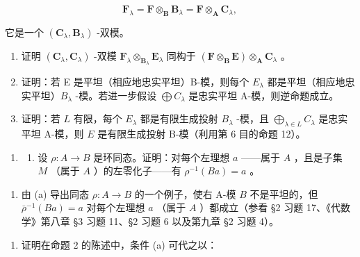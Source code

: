 \[
\mathbf {F} _ {\lambda} = \mathbf {F} \otimes_ {\mathbf {B}} \mathbf {B} _ {\lambda} = \mathbf {F} \otimes_ {\mathbf {A}} \mathbf {C} _ {\lambda},
\]

它是一个 \((\mathbf{C}_{\lambda},\mathbf{B}_{\lambda})\) -双模。

\begin{enumerate}
\def\labelenumi{(\alph{enumi})}
\item
证明 \((\mathbf{C}_{\lambda},\mathbf{C}_{\lambda})\) -双模 \(\mathbf{F}_{\lambda}\otimes_{\mathbf{B}_{\lambda}}\mathbf{E}_{\lambda}\) 同构于 \((\mathbf{F}\otimes_{\mathbf{B}}\mathbf{E})\otimes_{\mathbf{A}}\mathbf{C}_{\lambda}\) 。
\item
证明：若 E 是平坦（相应地忠实平坦）B-模，则每个 \(E_{\lambda}\) 都是平坦（相应地忠实平坦）\(B_{\lambda}\) -模。若进一步假设 \(\bigoplus C_{\lambda}\) 是忠实平坦 A-模，则逆命题成立。
\item
证明：若 \(L\) 有限，每个 \(E_{\lambda}\) 都是有限生成投射 \(B_{\lambda}\) -模，且 \(\bigoplus_{\lambda \in L} C_{\lambda}\) 是忠实平坦 A-模，则 \(E\) 是有限生成投射 B-模（利用第 6 目的命题 12）。
\end{enumerate}

\begin{enumerate}
\def\labelenumi{\arabic{enumi}.}
\setcounter{enumi}{9}
\tightlist
\item
  \begin{enumerate}
  \def\labelenumii{(\alph{enumii})}
  \tightlist
  \item
  设 \(\rho: A \to B\) 是环同态。证明：对每个左理想 \(a\) ——属于 \(A\) ，且是子集 \(M\) （属于 \(A\) ）的左零化子——有 \(\rho^{-1}(Ba) = a\) 。
  \end{enumerate}
\end{enumerate}

\begin{enumerate}
\def\labelenumi{(\alph{enumi})}
\setcounter{enumi}{1}
\tightlist
\item
由 (a) 导出同态 \(\rho: A \to B\) 的一个例子，使右 A-模 \(B\) 不是平坦的，但 \(\bar{\rho}^{-1}(Ba) = a\) 对每个左理想 \(a\) （属于 \(A\) ）都成立（参看 §2 习题 17、《代数学》第八章 §3 习题 11、§2 习题 6 以及第九章 §2 习题 4）。
\end{enumerate}


\begin{enumerate}
\def\labelenumi{\arabic{enumi}.}
\tightlist
\item
  证明在命题 2 的陈述中，条件 (a) 可代之以：
\end{enumerate}

